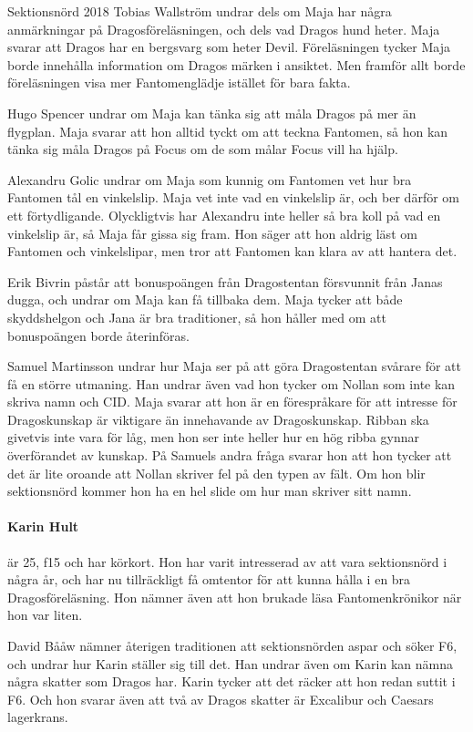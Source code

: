 \documentclass[hidelinks]{sektionsmote}
\begin{document}
Sektionsnörd 2018 Tobias Wallström undrar dels om Maja har några anmärkningar på Dragosföreläsningen, och dels vad Dragos hund heter.
Maja svarar att Dragos har en bergsvarg som heter Devil.
Föreläsningen tycker Maja borde innehålla information om Dragos märken i ansiktet.
Men framför allt borde föreläsningen visa mer Fantomenglädje istället för bara fakta.

Hugo Spencer undrar om Maja kan tänka sig att måla Dragos på mer än flygplan.
Maja svarar att hon alltid tyckt om att teckna Fantomen, så hon kan tänka sig måla Dragos på Focus om de som målar Focus vill ha hjälp.

Alexandru Golic undrar om Maja som kunnig om Fantomen vet hur bra Fantomen tål en vinkelslip.
Maja vet inte vad en vinkelslip är, och ber därför om ett förtydligande.
Olyckligtvis har Alexandru inte heller så bra koll på vad en vinkelslip är, så Maja får gissa sig fram.
Hon säger att hon aldrig läst om Fantomen och vinkelslipar, men tror att Fantomen kan klara av att hantera det.

Erik Bivrin påstår att bonuspoängen från Dragostentan försvunnit från Janas dugga, och undrar om Maja kan få tillbaka dem.
Maja tycker att både skyddshelgon och Jana är bra traditioner, så hon håller med om att bonuspoängen borde återinföras.

Samuel Martinsson undrar hur Maja ser på att göra Dragostentan svårare för att få en större utmaning.
Han undrar även vad hon tycker om Nollan som inte kan skriva namn och CID.
Maja svarar att hon är en förespråkare för att intresse för Dragoskunskap är viktigare än innehavande av Dragoskunskap.
Ribban ska givetvis inte vara för låg, men hon ser inte heller hur en hög ribba gynnar överförandet av kunskap.
På Samuels andra fråga svarar hon att hon tycker att det är lite oroande att Nollan skriver fel på den typen av fält.
Om hon blir sektionsnörd kommer hon ha en hel slide om hur man skriver sitt namn.

\paragraph{Karin Hult} är 25, f15 och har körkort.
Hon har varit intresserad av att vara sektionsnörd i några år, och har nu tillräckligt få omtentor för att kunna hålla i en bra Dragosföreläsning.
Hon nämner även att hon brukade läsa Fantomenkrönikor när hon var liten.

David Bååw nämner återigen traditionen att sektionsnörden aspar och söker F6, och undrar hur Karin ställer sig till det.
Han undrar även om Karin kan nämna några skatter som Dragos har.
Karin tycker att det räcker att hon redan suttit i F6.
Och hon svarar även att två av Dragos skatter är Excalibur och Caesars lagerkrans.
\end{document}
